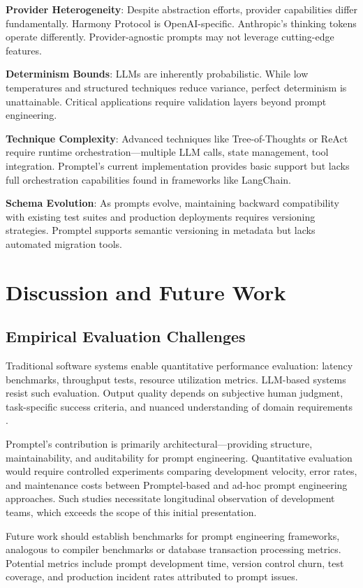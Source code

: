\documentclass[11pt,a4paper]{article}
\begin{document}
\textbf{Provider Heterogeneity}: Despite abstraction efforts, provider capabilities differ fundamentally. Harmony Protocol is OpenAI-specific. Anthropic's thinking tokens operate differently. Provider-agnostic prompts may not leverage cutting-edge features.

\textbf{Determinism Bounds}: LLMs are inherently probabilistic. While low temperatures and structured techniques reduce variance, perfect determinism is unattainable. Critical applications require validation layers beyond prompt engineering.

\textbf{Technique Complexity}: Advanced techniques like Tree-of-Thoughts or ReAct require runtime orchestration—multiple LLM calls, state management, tool integration. Promptel's current implementation provides basic support but lacks full orchestration capabilities found in frameworks like LangChain.

\textbf{Schema Evolution}: As prompts evolve, maintaining backward compatibility with existing test suites and production deployments requires versioning strategies. Promptel supports semantic versioning in metadata but lacks automated migration tools.

\section{Discussion and Future Work}

\subsection{Empirical Evaluation Challenges}

Traditional software systems enable quantitative performance evaluation: latency benchmarks, throughput tests, resource utilization metrics. LLM-based systems resist such evaluation. Output quality depends on subjective human judgment, task-specific success criteria, and nuanced understanding of domain requirements \cite{liang2022holistic}.

Promptel's contribution is primarily architectural—providing structure, maintainability, and auditability for prompt engineering. Quantitative evaluation would require controlled experiments comparing development velocity, error rates, and maintenance costs between Promptel-based and ad-hoc prompt engineering approaches. Such studies necessitate longitudinal observation of development teams, which exceeds the scope of this initial presentation.

Future work should establish benchmarks for prompt engineering frameworks, analogous to compiler benchmarks or database transaction processing metrics. Potential metrics include prompt development time, version control churn, test coverage, and production incident rates attributed to prompt issues.
\end{document}

